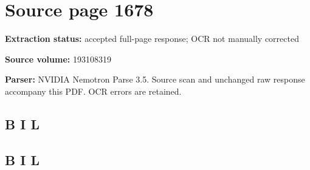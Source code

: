 \clearpage
\section{Source page 1678}
\textbf{Extraction status:} accepted full-page response; OCR not manually corrected\par
\textbf{Source volume:} 193108319\par
\textbf{Parser:} NVIDIA Nemotron Parse 3.5. Source scan and unchanged raw response accompany this PDF. OCR errors are retained.\par\medskip
\subsection*{B I L}
\subsection*{B I L}

